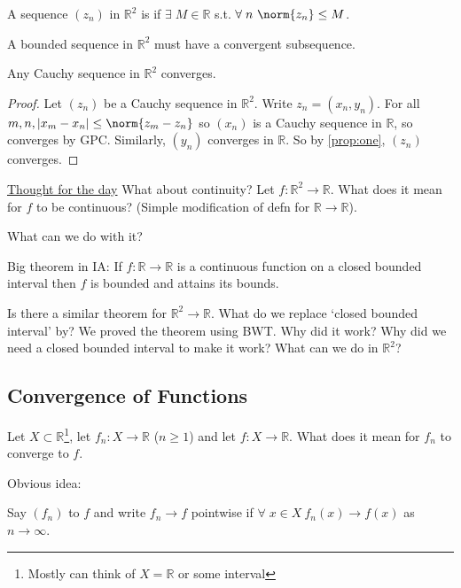 \begin{definition}
    A sequence $(z_n)$ in $\mathbb{R}^2$ is  if $\exists \; M \in \mathbb{R}$ s.t. $\forall \; n \ \norm{z_n} \leq M$.
\end{definition} 

\begin{theorem}
    A bounded sequence in $\mathbb{R}^2$ must have a convergent subsequence.
\end{theorem} 

\begin{theorem}
    Any Cauchy sequence in $\mathbb{R}^2$ converges.
\end{theorem} 

\begin{proof}
    Let $(z_n)$ be a Cauchy sequence in $\mathbb{R}^2$.
    Write $z_n = (x_n, y_n)$.
    For all $m, n, |x_m - x_n| \leq \norm{z_m - z_n}$ so $(x_n)$ is a Cauchy sequence in $\mathbb{R}$, so converges by GPC.
    Similarly, $(y_n)$ converges in $\mathbb{R}$.
    So by \ref{prop:one}, $(z_n)$ converges.
\end{proof} 

\underline{Thought for the day} What about continuity?
Let $f: \mathbb{R}^2 \to \mathbb{R}$.
What does it mean for $f$ to be continuous?
(Simple modification of defn for $\mathbb{R} \to \mathbb{R}$).

What can we do with it?

Big theorem in IA: If $f: \mathbb{R} \to \mathbb{R}$ is a continuous function on a closed bounded interval then $f$ is bounded and attains its bounds.

Is there a similar theorem for $\mathbb{R}^2 \to \mathbb{R}$.
What do we replace `closed bounded interval' by?
We proved the theorem using BWT.
Why did it work?
Why did we need a closed bounded interval to make it work?
What can we do in $\mathbb{R}^2$?

\subsection{Convergence of Functions}
Let $X \subset \mathbb{R}$\footnote{Mostly can think of $X = \mathbb{R}$ or some interval}, let $f_n : X \to \mathbb{R}$ ($n \geq 1$) and let $f: X \to \mathbb{R}$.
What does it mean for $f_n$ to converge to $f$.

Obvious idea:
\begin{definition}
    Say $(f_n)$  to $f$ and write $f_n \to f$ pointwise if $\forall \; x \in X \ f_n(x) \to f(x)$ as $n \to \infty$.
\end{definition} 


